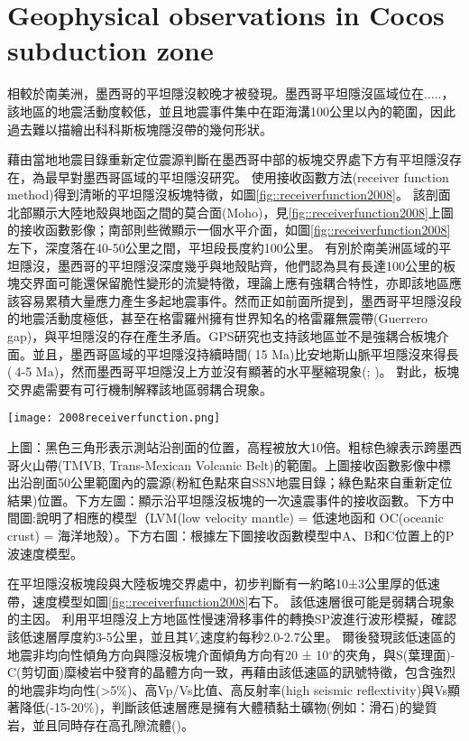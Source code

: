 \section{Geophysical observations in Cocos subduction zone}
相較於南美洲，墨西哥的平坦隱沒較晚才被發現。墨西哥平坦隱沒區域位在.....，該地區的地震活動度較低，並且地震事件集中在距海溝100公里以內的範圍，因此過去難以描繪出科科斯板塊隱沒帶的幾何形狀。

\citealp{pardo1995}藉由當地地震目錄重新定位震源判斷在墨西哥中部的板塊交界處下方有平坦隱沒存在，為最早對墨西哥區域的平坦隱沒研究。
\citealp{PerezCampos2008}使用接收函數方法(receiver function method)得到清晰的平坦隱沒板塊特徵，如圖\ref{fig::receiverfunction2008}。
該剖面北部顯示大陸地殼與地函之間的莫合面(Moho)，見\ref{fig::receiverfunction2008}上圖的接收函數影像；南部則些微顯示一個水平介面，如圖\ref{fig::receiverfunction2008}左下，深度落在40-50公里之間，平坦段長度約100公里。
有別於南美洲區域的平坦隱沒，墨西哥的平坦隱沒深度幾乎與地殼貼齊，他們認為具有長達100公里的板塊交界面可能還保留脆性變形的流變特徵，理論上應有強耦合特性，亦即該地區應該容易累積大量應力產生多起地震事件。然而正如前面所提到，墨西哥平坦隱沒段的地震活動度極低，甚至在格雷羅州擁有世界知名的格雷羅無震帶(Guerrero gap)，與平坦隱沒的存在產生矛盾。GPS研究也支持該地區並不是強耦合板塊介面。並且，墨西哥區域的平坦隱沒持續時間($~$15 Ma)比安地斯山脈平坦隱沒來得長($~$4-5 Ma)，然而墨西哥平坦隱沒上方並沒有顯著的水平壓縮現象(\citealp{nieto2006latest}; \citealp{moran2007cenozoic})。
對此，板塊交界處需要有可行機制解釋該地區弱耦合現象。

\begin{figure*}[ht!]
    \centering
    \texttt{[image: 2008receiverfunction.png]}
    \caption[墨西哥平坦隱沒區域接收函數結果，摘自\citealp{PerezCampos2008}]。{上圖：黑色三角形表示測站沿剖面的位置，高程被放大10倍。粗棕色線表示跨墨西哥火山帶(TMVB, Trans-Mexican Volcanic Belt)的範圍。上圖接收函數影像中標出沿剖面50公里範圍內的震源(粉紅色點來自SSN地震目錄；綠色點來自\citealp{pardo1995}重新定位結果)位置。下方左圖：顯示沿平坦隱沒板塊的一次遠震事件的接收函數。下方中間圖:說明了相應的模型（LVM(low velocity mantle) = 低速地函和 OC(oceanic crust) = 海洋地殼）。下方右圖：根據左下圖接收函數模型中A、B和C位置上的P波速度模型。
    }
    \label{fig::receiverfunction2008}
\end{figure*}

\citealp{PerezCampos2008}在平坦隱沒板塊段與大陸板塊交界處中，初步判斷有一約略10±3公里厚的低速帶，速度模型如圖\ref{fig::receiverfunction2008}右下。
該低速層很可能是弱耦合現象的主因。
\citealp{Song2009}利用平坦隱沒上方地區性慢速滑移事件的轉換SP波進行波形模擬，確認該低速層厚度約3-5公里，並且其$V_s$速度約每秒2.0-2.7公里。
爾後\citealp{Song2012SC}發現該低速區的地震非均向性傾角方向與隱沒板塊介面傾角方向有20 ± 10$^{\circ}$的夾角，與S(葉理面)-C(剪切面)糜棱岩中發育的晶體方向一致，再藉由該低速區的訊號特徵，包含強烈的地震非均向性(>5$\%$)、高Vp/Vs比值、高反射率(high seismic reflextivity)與Vs顯著降低(-15-20$\%$)，判斷該低速層應是擁有大體積黏土礦物(例如：滑石)的變質岩，並且同時存在高孔隙流體(\citealp{Kim2012})。

